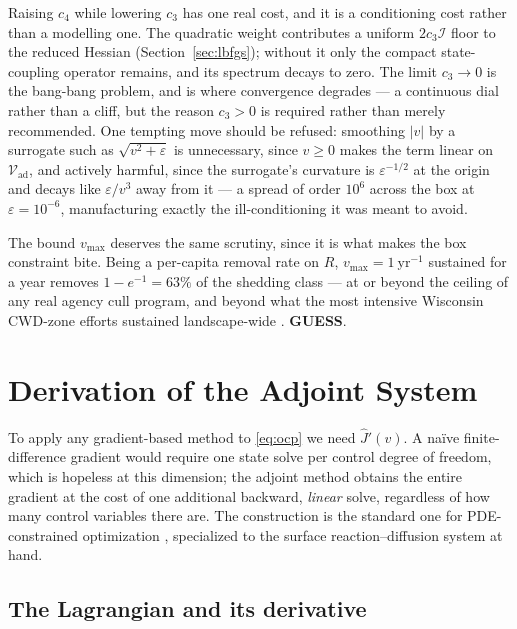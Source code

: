 \documentclass[11pt]{article}
\newcommand{\tagGUESS}{{\footnotesize\textsf{\textbf{\textcolor{red!70!black}{GUESS}}}}}
\newcommand{\Vad}{\mathcal{V}_{\mathrm{ad}}}
\begin{document}
Raising $c_4$ while lowering $c_3$ has one real cost, and it is a conditioning cost rather than a modelling one. The quadratic weight contributes a uniform $2c_3\mathcal{I}$ floor to the reduced Hessian (Section~\ref{sec:lbfgs}); without it only the compact state-coupling operator remains, and its spectrum decays to zero. The limit $c_3\to0$ is the bang-bang problem, and is where convergence degrades --- a continuous dial rather than a cliff, but the reason $c_3>0$ is required rather than merely recommended. One tempting move should be refused: smoothing $|v|$ by a surrogate such as $\sqrt{v^2+\varepsilon}$ is unnecessary, since $v\ge0$ makes the term linear on $\Vad$, and actively harmful, since the surrogate's curvature is $\varepsilon^{-1/2}$ at the origin and decays like $\varepsilon/v^3$ away from it --- a spread of order $10^6$ across the box at $\varepsilon=10^{-6}$, manufacturing exactly the ill-conditioning it was meant to avoid.

The bound $v_{\max}$ deserves the same scrutiny, since it is what makes the box constraint bite. Being a per-capita removal rate on $R$, $v_{\max} = 1\ \mathrm{yr}^{-1}$ sustained for a year removes $1 - e^{-1} = 63\%$ of the shedding class --- at or beyond the ceiling of any real agency cull program, and beyond what the most intensive Wisconsin CWD-zone efforts sustained landscape-wide \citep{Wasserberg2009}. \tagGUESS{}.

\section{Derivation of the Adjoint System}
\label{sec:adjoint-derivation}

To apply any gradient-based method to \eqref{eq:ocp} we need $\hat J'(v)$. A na\"ive finite-difference gradient would require one state solve per control degree of freedom, which is hopeless at this dimension; the adjoint method obtains the entire gradient at the cost of one additional backward, \emph{linear} solve, regardless of how many control variables there are. The construction is the standard one for PDE-constrained optimization \citep{Hinze2009}, specialized to the surface reaction--diffusion system at hand.

\subsection{The Lagrangian and its derivative}
\end{document}
